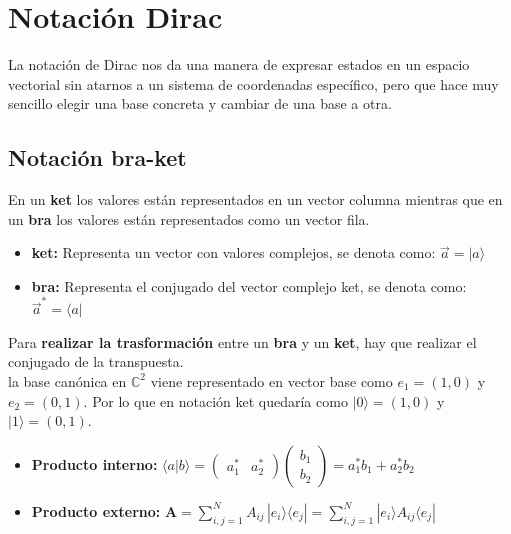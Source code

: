 \chapter{Notación Dirac}
\label{chap:notacion_dirac}

La notación de Dirac nos da una manera de expresar estados en un espacio vectorial sin atarnos a un sistema de coordenadas específico, pero que hace muy sencillo elegir una base concreta y cambiar de una base a otra.

\section{Notación bra-ket}

En un \textbf{ket} los valores están representados en un vector columna mientras que en un \textbf{bra} los valores están representados como un vector fila.

\begin{itemize}
    \item \textbf{ket:} Representa un vector con valores complejos, se denota como: $\vec{a} = |a\rangle$
    \item \textbf{bra:} Representa el conjugado del vector complejo ket, se denota como: $\vec{a}^{*} = \langle a|$
\end{itemize}


Para \textbf{realizar la trasformación} entre un \textbf{bra} y un \textbf{ket}, hay que realizar el conjugado de la transpuesta.\\

la base canónica en $\mathbb{C}^2$ viene representado en vector base como $e_1 = (1, 0)$ y $e_2 = (0, 1)$. Por lo que en notación ket quedaría como $|0\rangle = (1, 0)$ y $|1\rangle = (0, 1)$.

\begin{itemize}
    \item \textbf{Producto interno:}  $\langle a|b\rangle = \begin{pmatrix} a_1^{*} & a_2^{*} \end{pmatrix}
                                        \begin{pmatrix} b_1\\ b_2 \end{pmatrix} = a_1^{*} b_1 + a_2^{*} b_2$
    \item \textbf{Producto externo:} $\mathbf{A} = \sum_{i,j=1}^{N} A_{ij}\,|e_i\rangle\langle e_j|
                                      = \sum_{i,j=1}^{N} |e_i\rangle A_{ij} \langle e_j|$
\end{itemize}
